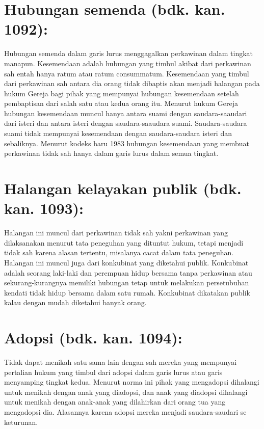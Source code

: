 \section{Hubungan semenda (bdk. kan. 1092):}

Hubungan semenda dalam garis lurus menggagalkan perkawinan dalam tingkat manapun. Kesemendaan adalah hubungan yang timbul akibat dari perkawinan sah entah hanya ratum atau ratum consummatum. Kesemendaan yang timbul dari perkawinan sah antara dia orang tidak dibaptis akan menjadi halangan pada hukum Gereja bagi pihak yang mempunyai hubungan kesemendaan setelah pembaptisan dari salah satu atau kedua orang itu. Menurut hukum Gereja hubungan kesemendaan muncul hanya antara suami dengan saudara-saaudari dari isteri dan antara isteri dengan saudara-saaudara suami. Saudara-saudara suami tidak mempunyai kesemendaan dengan saudara-saudara isteri dan sebaliknya. Menurut kodeks baru 1983 hubungan kesemendaan yang membuat perkawinan tidak sah hanya dalam garis lurus dalam semua tingkat.

\section{Halangan kelayakan publik (bdk. kan. 1093):}

Halangan ini muncul dari perkawinan tidak sah yakni perkawinan yang dilaksanakan menurut tata peneguhan yang dituntut hukum, tetapi menjadi tidak sah karena alasan tertentu, misalanya cacat dalam tata peneguhan. Halangan ini muncul juga dari konkubinat yang diketahui publik. Konkubinat adalah seorang laki-laki dan perempuan hidup bersama tanpa perkawinan atau sekurang-kurangnya memiliki hubungan tetap untuk melakukan persetubuhan kendati tidak hidup bersama dalam satu rumah. Konkubinat dikatakan publik kalau dengan mudah diketahui banyak orang.

\section{Adopsi (bdk. kan. 1094):}

Tidak dapat menikah satu sama lain  dengan sah mereka yang mempunyai pertalian hukum yang timbul dari adopsi dalam garis lurus atau garis menyamping tingkat kedua. Menurut norma ini pihak yang mengadopsi dihalangi untuk menikah dengan anak yang diadopsi, dan anak yang diadopsi dihalangi untuk menikah dengan anak-anak yang dilahirkan dari orang tua yang mengadopsi dia. Alasannya karena adopsi mereka menjadi saudara-saudari se keturunan.